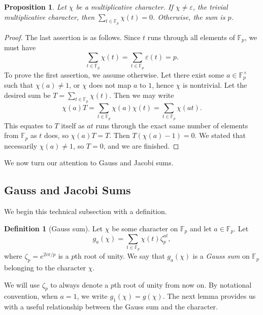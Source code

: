 \documentclass[10pt]{amsart}
\newcommand{\eps}{\varepsilon}
\theoremstyle{plain}
\newtheorem{prop}[thm]{Proposition}
\theoremstyle{definition}
\newtheorem{defn}{Definition}
\theoremstyle{remark}
\numberwithin{equation}{section}
\begin{document}
\begin{prop} \label{Proposition: proof about sum of elements evaluated by a character prop}
    Let $\chi$ be a multiplicative character. If $\chi\neq\eps$, the trivial multiplicative character, then $\sum_{t\in \mathbb{F}_{p}}\chi(t)=0$. Otherwise, the sum is $p$. 
\end{prop}
\begin{proof}
    The last assertion is as follows. Since $t$ runs through all elements of $\mathbb{F}_{p}$, we must have \begin{equation*}
        \sum_{t\in \mathbb{F}_{p}}\chi(t)=\sum_{t\in \mathbb{F}_{p}}\eps(t)=p.
    \end{equation*} 
    To prove the first assertion, we assume otherwise. Let there exist some $a\in \mathbb{F}_{p}^{\times}$ such that $\chi(a)\neq 1$, or $\chi$ does not map $a$ to $1$, hence $\chi$ is nontrivial. Let the desired sum be $T=\sum_{t\in \mathbb{F}_{p}}\chi(t)$. Then we may write
    \begin{equation*}
        \chi(a)T=\sum_{t\in \mathbb{F}_{p}}\chi(a)\chi(t)=\sum_{t\in \mathbb{F}_{p}}\chi(at).
    \end{equation*}
    This equates to $T$ itself as $at$ runs through the exact same number of elements from $\mathbb{F}_p$ as $t$ does, so $\chi(a)T=T$. Then $T(\chi(a)-1)=0$. We stated that necessarily $\chi(a)\neq 1$, so $T=0$, and we are finished.  
\end{proof}

We now turn our attention to Gauss and Jacobi sums. 

\subsection*{Gauss and Jacobi Sums}
We begin this technical subsection with a definition. 

\begin{defn}[Gauss sum]
    Let $\chi$ be some character on $\mathbb{F}_{p}$ and let $a\in\mathbb{F}_{p}$. Let 
    \begin{equation*}
        g_{a}(\chi)=\sum_{t\in\mathbb{F}_{p}}\chi(t)\zeta_{p}^{at},
    \end{equation*}
    where $\zeta_{p}=e^{2i\pi/p}$ is a $p$th root of unity. We say that $g_{a}(\chi)$ is a \textit{Gauss sum} on $\mathbb{F}_{p}$ belonging to the character $\chi$. 
\end{defn}

We will use $\zeta_{p}$ to always denote a $p$th root of unity from now on. By notational convention, when $a=1$, we write $g_{1}(\chi)=g(\chi)$. The next lemma provides us with a useful relationship between the Gauss sum and the character. 
\end{document}
